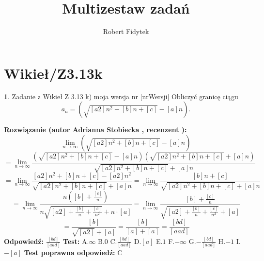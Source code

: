 \documentclass[12pt, a4paper]{article}
\title{Multizestaw zadań}
\author{Robert Fidytek}
\date{}
\theoremstyle{definition} %
\newtheorem{zad}{}
\newcommand{\kategoria}[1]{\section{#1}} %
\newcommand{\zadStart}[1]{\begin{zad}#1\newline} %
\newcommand{\zadStop}{\end{zad}}   %
\newcommand{\rozwStart}[2]{\noindent \textbf{Rozwiązanie (autor #1 , recenzent #2): }\newline} %
\newcommand{\rozwStop}{\newline}                                            %
\newcommand{\odpStart}{\noindent \textbf{Odpowiedź:}\newline}    %
\newcommand{\odpStop}{\newline}                                             %
\newcommand{\testStart}{\noindent \textbf{Test:}\newline} %
\newcommand{\testStop}{\newline} %
\newcommand{\kluczStart}{\noindent \textbf{Test poprawna odpowiedź:}\newline} %
\newcommand{\kluczStop}{\newline} %
\begin{document}
\maketitle


\kategoria{Wikieł/Z3.13k}
\zadStart{Zadanie z Wikieł Z 3.13 k) moja wersja nr [nrWersji]}
Obliczyć granicę ciągu 
$$a_n=(\sqrt{[a2]n^2+[b]n+[c]}-[a]n).$$
\zadStop
\rozwStart{Adrianna Stobiecka}{}
$$\lim_{n\to\infty}(\sqrt{[a2]n^2+[b]n+[c]}-[a]n)$$
$$=\lim_{n\to\infty}\frac{(\sqrt{[a2]n^2+[b]n+[c]}-[a]n)(\sqrt{[a2]n^2+[b]n+[c]}+[a]n)}{\sqrt{[a2]n^2+[b]n+[c]}+[a]n}$$
$$=\lim_{n\to\infty}\frac{[a2]n^2+[b]n+[c]-[a2]n^2}{\sqrt{[a2]n^2+[b]n+[c]}+[a]n}=\lim_{n\to\infty}\frac{[b]n+[c]}{\sqrt{[a2]n^2+[b]n+[c]}+[a]n}$$
$$=\lim_{n\to\infty}\frac{n([b]+\frac{[c]}{n})}{n\sqrt{[a2]+\frac{[b]}{n}+\frac{[c]}{n^2}}+n\cdot[a]}=\lim_{n\to\infty}\frac{[b]+\frac{[c]}{n}}{\sqrt{[a2]+\frac{[b]}{n}+\frac{[c]}{n^2}}+[a]}$$
$$=\frac{[b]}{\sqrt{[a2]}+[a]}=\frac{[b]}{[a]+[a]}=\frac{[bd]}{[aad]}$$
\rozwStop
\odpStart
$\frac{[bd]}{[aad]}$
\odpStop
\testStart
A.$\infty$
B.$0$
C.$\frac{[bd]}{[aad]}$
D.$[a]$
E.$1$
F.$-\infty$
G.$-\frac{[bd]}{[aad]}$
H.$-1$
I.$-[a]$
\testStop
\kluczStart
C
\kluczStop
\end{document}
